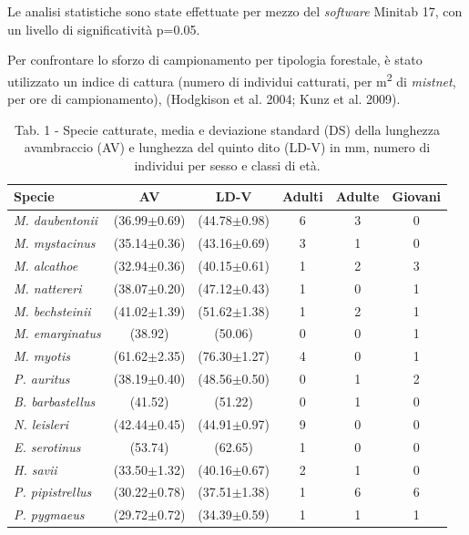 \begin{multicols}{2}
Le analisi statistiche sono state effettuate per mezzo del \textit{software} Minitab 17, con un livello di significatività p=0.05.

Per confrontare lo sforzo di campionamento per tipologia forestale, è stato utilizzato un indice di cattura (numero di individui catturati, per m\textsuperscript{2} di \textit{mistnet}, per ore di campionamento), (Hodgkison et al. 2004; Kunz et al. 2009).


\begin{table}[t]
\caption*{Tab. 1 - Specie catturate, media e deviazione standard (DS) della lunghezza avambraccio (AV) e lunghezza del quinto dito (LD-V) in mm, numero di individui per sesso e classi di età.}
\centering\small
\begin{tabular}{lccccc}
\textbf{Specie}&\textbf{AV}&\textbf{LD-V}&\textbf{\Male{} Adulti} & \textbf{\Female{} Adulte} & \textbf{Giovani}\\
\hline
\emph{M. daubentonii} & (36.99$\pm$0.69) & (44.78$\pm$0.98) & 6 & 3 & 0\\
\emph{M. mystacinus} & (35.14$\pm$0.36) & (43.16$\pm$0.69) & 3 & 1 & 0\\
\emph{M. alcathoe} & (32.94$\pm$0.36) & (40.15$\pm$0.61) & 1 & 2 & 3\\
\emph{M. nattereri} & (38.07$\pm$0.20) & (47.12$\pm$0.43) & 1 & 0 & 1\\
\emph{M. bechsteinii} & (41.02$\pm$1.39) & (51.62$\pm$1.38) & 1 & 2 & 1\\
\emph{M. emarginatus} & (38.92) & (50.06) & 0 & 0 & 1\\
\emph{M. myotis} & (61.62$\pm$2.35) & (76.30$\pm$1.27) & 4 & 0 & 1\\
\emph{P. auritus} & (38.19$\pm$0.40) & (48.56$\pm$0.50) & 0 & 1 & 2\\
\emph{B. barbastellus} & (41.52) & (51.22) & 0 & 1 & 0\\
\emph{N. leisleri} & (42.44$\pm$0.45) & (44.91$\pm$0.97) & 9 & 0 & 0\\
\emph{E. serotinus} & (53.74) & (62.65) & 1 & 0 & 0\\
\emph{H. savii} & (33.50$\pm$1.32) & (40.16$\pm$0.67) & 2 & 1 & 0\\
\emph{P. pipistrellus} & (30.22$\pm$0.78) & (37.51$\pm$1.38) & 1 & 6 & 6\\
\emph{P. pygmaeus} & (29.72$\pm$0.72) & (34.39$\pm$0.59) & 1 & 1 & 1\\
\end{tabular}
\end{table}


\end{multicols}
